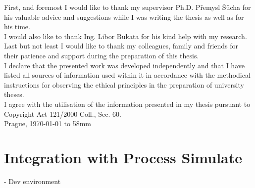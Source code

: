 \documentclass[11pt,twoside,a4paper]{book}
\author{Jan Dryk}
\begin{document}

\cleardoublepage

\maketitle
\cleardoublepage

{%
	First, and foremost I would like to thank my supervisor Ph.D. Přemysl Šůcha for his
    valuable advice and suggestions while I was writing the thesis as well as for his time.\\
    
    I would also like to thank Ing. Libor Bukata for his kind help with my research.\\
    
    Last but not least I would like to thank my colleagues, family and friends for their patience
    and support during the preparation of this thesis. \\
}
{%
    I declare that the presented work was developed independently and that I have listed
    all sources of information used within it in accordance with the methodical instructions for
    observing the ethical principles in the preparation of university theses. \\
    
    I agree with the utilisation of the information presented in my thesis pursuant to
    Copyright Act 121/2000 Coll., Sec. 60. 
\\[90mm]
	Prague, \today \vspace{10mm} \hfill \hbox to 58mm{\tiny\dotfill}
}

\cleardoublepage


{
    
}
{
    
}

\setcounter{page}{1}

\tableofcontents







\chapter{Integration with Process Simulate}
- Dev environment
\end{document}
